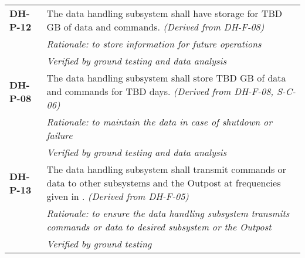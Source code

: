 \begin{longtable}{P{2cm}P{13.25cm}}
\textbf{DH-P-12}	& The data handling subsystem shall have storage for \gls{TBD} \gls{GB} of data and commands.
\textit{(Derived from DH-F-08)} \\
 & \textit{Rationale: to store information for future operations} \\
 & \textit{Verified by ground testing and data analysis}		 									\\
\textbf{DH-P-08}	&     The data handling subsystem shall store \gls{TBD} \gls{GB} of data and commands for TBD days. \textit{(Derived from DH-F-08, S-C-06)}  \\
 & \textit{Rationale: to maintain the data in case of shutdown or failure} \\
 & \textit{Verified by ground testing and data analysis}	\\
 
\textbf{DH-P-13}	&     The data handling subsystem shall transmit commands or data to other subsystems and the Outpost at frequencies given in .
\textit{(Derived from DH-F-05)} \\
 & \textit{Rationale: to ensure the data handling subsystem transmits commands or data to desired subsystem or the Outpost} \\
 & \textit{Verified by ground testing}	
\end{longtable}